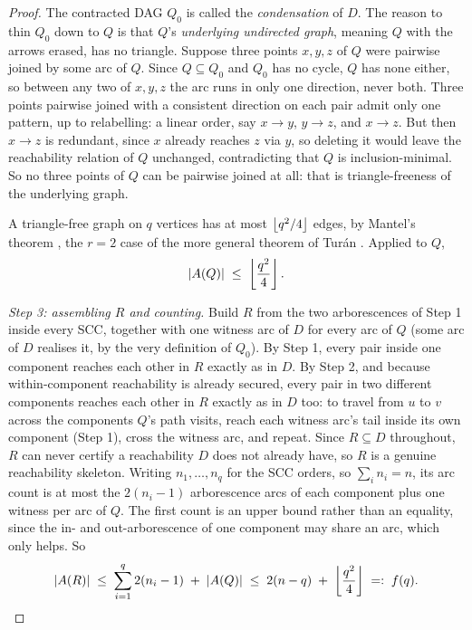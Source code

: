 \begin{proof}
The contracted DAG $Q_0$ is called the \emph{condensation} of $D$. The reason to thin $Q_0$ down to $Q$ is that $Q$'s \emph{underlying undirected graph}, meaning $Q$ with the arrows erased, has no triangle. Suppose three points $x, y, z$ of $Q$ were pairwise joined by some arc of $Q$. Since $Q \subseteq Q_0$ and $Q_0$ has no cycle, $Q$ has none either, so between any two of $x,y,z$ the arc runs in only one direction, never both. Three points pairwise joined with a consistent direction on each pair admit only one pattern, up to relabelling: a linear order, say $x \to y$, $y \to z$, and $x \to z$. But then $x \to z$ is redundant, since $x$ already reaches $z$ via $y$, so deleting it would leave the reachability relation of $Q$ unchanged, contradicting that $Q$ is inclusion-minimal. So no three points of $Q$ can be pairwise joined at all: that is triangle-freeness of the underlying graph.

A triangle-free graph on $q$ vertices has at most $\left\lfloor q^2/4 \right\rfloor$ edges, by Mantel's theorem \cite{Mantel07}, the $r = 2$ case of the more general theorem of Tur\'an \cite{Turan41}. Applied to $Q$,
\[
    |A(Q)| \;\le\; \left\lfloor \frac{q^2}{4} \right\rfloor.
\]

\emph{Step 3: assembling $R$ and counting.} Build $R$ from the two arborescences of Step 1 inside every SCC, together with one witness arc of $D$ for every arc of $Q$ (some arc of $D$ realises it, by the very definition of $Q_0$). By Step 1, every pair inside one component reaches each other in $R$ exactly as in $D$. By Step 2, and because within-component reachability is already secured, every pair in two different components reaches each other in $R$ exactly as in $D$ too: to travel from $u$ to $v$ across the components $Q$'s path visits, reach each witness arc's tail inside its own component (Step 1), cross the witness arc, and repeat. Since $R \subseteq D$ throughout, $R$ can never certify a reachability $D$ does not already have, so $R$ is a genuine reachability skeleton. Writing $n_1, \dots, n_q$ for the SCC orders, so $\sum_i n_i = n$, its arc count is at most the $2(n_i-1)$ arborescence arcs of each component plus one witness per arc of $Q$. The first count is an upper bound rather than an equality, since the in- and out-arborescence of one component may share an arc, which only helps. So
\[
    |A(R)| \;\le\; \sum_{i=1}^{q} 2(n_i - 1) \;+\; |A(Q)| \;\le\; 2(n-q) \;+\; \left\lfloor \frac{q^2}{4} \right\rfloor \;=:\; f(q).
\]


\end{proof}
